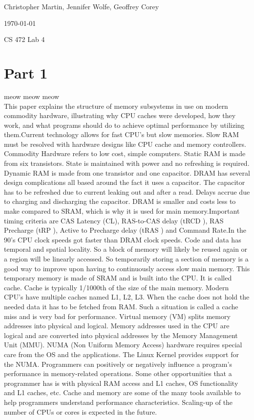 \documentclass[letterpaper,10pt,titlepage]{article}
\def\name{Christopher Martin, Jennifer Wolfe, Geoffrey Corey}
\begin{document}
\hfill \name

\hfill \today

\hfill CS 472 Lab 4

\section*{Part 1}

meow meow meow\\

This paper explains the structure of memory subsystems in use on modern commodity hardware, illustrating why CPU caches were developed, how they work, and what programs should do to achieve optimal performance by utilizing them.Current technology allows for fast CPU's but slow memories. Slow RAM must be resolved with hardware designs like CPU cache and memory controllers. Commodity Hardware refers to low cost, simple computers. Static RAM is made from six transistors. State is maintained with power and no refreshing is required. Dynamic RAM is made from one transistor and one capacitor. DRAM has several design complications all based around the fact it uses a capacitor. The capacitor has to be refreshed due to current leaking out and after a read. Delays accrue due to charging and discharging the capacitor. DRAM is smaller and costs less to make compared to SRAM, which is why it is used for main memory.Important timing criteria are CAS Latency (CL), RAS-to-CAS delay (tRCD ), RAS Precharge (tRP ), Active to Precharge delay (tRAS ) and Command Rate.In the 90's CPU clock speeds got faster than DRAM clock speeds. Code and data has temporal and spatial locality. So a block of memory will likely be reused again or a region will be linearly accessed. So temporarily storing a section of memory is a good way to improve upon having to continuously access slow main memory. This temporary memory is made of SRAM and is built into the CPU. It is called cache. Cache is typically 1/1000th of the size of the main memory. Modern CPU's have multiple caches named L1, L2, L3. When the cache does not hold the needed data it has to be fetched from RAM. Such a situation is called a cache miss and is very bad for performance. Virtual memory (VM) splits memory addresses into physical and logical. Memory addresses used in the CPU are logical and are converted into physical addresses by the Memory Management Unit (MMU). NUMA (Non Uniform Memory Access) hardware requires special care from the OS and the applications. The Linux Kernel provides support for the NUMA. Programmers can positively or negatively influence a program’s performance in memory-related operations. Some other opportunities that a programmer has is with physical RAM access and L1 caches, OS functionality and L1 caches, etc. Cache and memory are some of the many tools available to help programmers understand performance characteristics. Scaling-up of the number of CPUs or cores is expected in the future. \\\\
\end{document}
